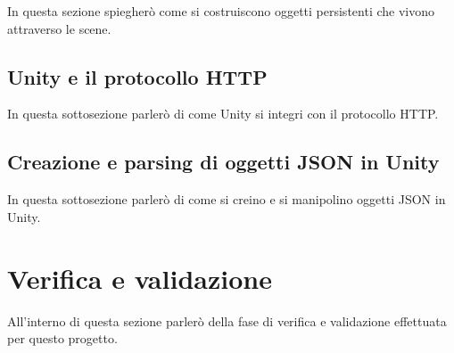 In questa sezione spiegherò come si costruiscono oggetti persistenti che vivono attraverso le scene.

\subsection{Unity e il protocollo HTTP}

In questa sottosezione parlerò di come Unity si integri con il protocollo HTTP.

\subsection{Creazione e parsing di oggetti JSON in Unity}

In questa sottosezione parlerò di come si creino e si manipolino oggetti JSON in Unity.

\section{Verifica e validazione}

All'interno di questa sezione parlerò della fase di verifica e validazione effettuata per questo progetto.
